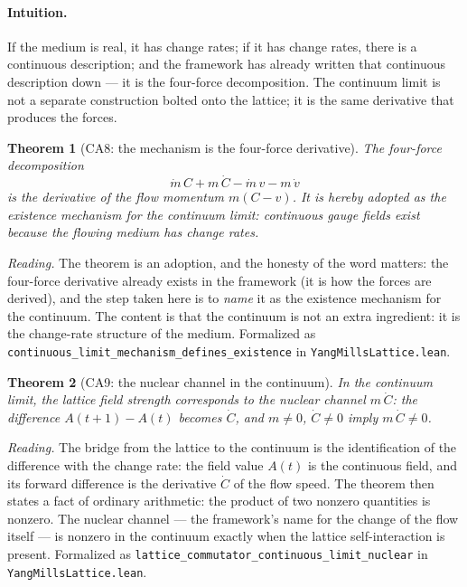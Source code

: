 \documentclass[aps,prd,preprint,superscriptaddress,amsmath,amssymb]{revtex4-2}
\newtheorem{theorem}{Theorem}[section]
\begin{document}
\paragraph{Intuition.}  If the medium is real, it has change rates;
if it has change rates, there is a continuous description; and the
framework has already written that continuous description down ---
it is the four-force decomposition.  The continuum limit is not a
separate construction bolted onto the lattice; it is the same
derivative that produces the forces.

\begin{theorem}[CA8: the mechanism is the four-force derivative]
\label{thm:ca8}
The four-force decomposition
\begin{equation}
\dot m\,C + m\,\dot C - \dot m\,v - m\,\dot v
\end{equation}
is the derivative of the flow momentum $m(C-v)$.  It is hereby
adopted as the \emph{existence mechanism for the continuum limit}:
continuous gauge fields exist because the flowing medium has change
rates.
\end{theorem}

\emph{Reading.}  The theorem is an adoption, and the honesty of the
word matters: the four-force derivative already exists in the
framework (it is how the forces are derived), and the step taken
here is to \emph{name} it as the existence mechanism for the
continuum.  The content is that the continuum is not an extra
ingredient: it is the change-rate structure of the medium.
Formalized as \texttt{continuous\_limit\_mechanism\_defines\_existence}
in \texttt{YangMillsLattice.lean}.

\begin{theorem}[CA9: the nuclear channel in the continuum]
\label{thm:ca9}
In the continuum limit, the lattice field strength corresponds to
the nuclear channel $m\,\dot C$: the difference $A(t{+}1)-A(t)$
becomes $\dot C$, and $m\neq0$, $\dot C\neq0$ imply $m\,\dot C\neq0$.
\end{theorem}

\emph{Reading.}  The bridge from the lattice to the continuum is the
identification of the difference with the change rate: the field
value $A(t)$ is the continuous field, and its forward difference is
the derivative $\dot C$ of the flow speed.  The theorem then states
a fact of ordinary arithmetic: the product of two nonzero quantities
is nonzero.  The nuclear channel --- the framework's name for the
change of the flow itself --- is nonzero in the continuum exactly
when the lattice self-interaction is present.  Formalized as
\texttt{lattice\_commutator\_continuous\_limit\_nuclear} in
\texttt{YangMillsLattice.lean}.
\end{document}
